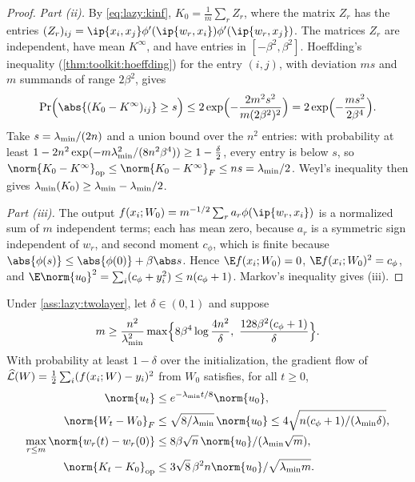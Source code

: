 \begin{refsection}
\begin{proof}
\emph{Part (ii).} By \eqref{eq:lazy:kinf}, $K_0=\frac1m\sum_rZ_r$, where the matrix $Z_r$ has the entries $(Z_r)_{ij}=\ip{x_i,x_j}\phi'(\ip{w_r,x_i})\phi'(\ip{w_r,x_j})$. The matrices $Z_r$ are independent, have mean $K^\infty$, and have entries in $[-\beta^2,\beta^2]$. Hoeffding's inequality (\cref{thm:toolkit:hoeffding}) for the entry $(i,j)$, with deviation $ms$ and $m$ summands of range $2\beta^2$, gives
\[
  \Pr\Bigl(\abs{(K_0-K^\infty)_{ij}}\ge s\Bigr)\le2\exp\Bigl(-\frac{2m^2s^2}{m(2\beta^2)^2}\Bigr)=2\exp\Bigl(-\frac{ms^2}{2\beta^4}\Bigr).
\]
Take $s=\lambda_{\min}/(2n)$ and a union bound over the $n^2$ entries: with probability at least $1-2n^2\exp(-m\lambda_{\min}^2/(8n^2\beta^4))\ge1-\frac\delta2$, every entry is below $s$, so $\norm{K_0-K^\infty}_{\op}\le\norm{K_0-K^\infty}_F\le ns=\lmin/2$. Weyl's inequality then gives $\lambda_{\min}(K_0)\ge\lambda_{\min}-\lambda_{\min}/2$.

\emph{Part (iii).} The output $f(x_i;W_0)=m^{-1/2}\sum_ra_r\phi(\ip{w_r,x_i})$ is a normalized sum of $m$ independent terms; each has mean zero, because $a_r$ is a symmetric sign independent of $w_r$, and second moment $c_\phi$, which is finite because $\abs{\phi(s)}\le\abs{\phi(0)}+\beta\abs s$. Hence $\E f(x_i;W_0)=0$, $\E f(x_i;W_0)^2=c_\phi$, and $\E\norm{u_0}^2=\sum_i(c_\phi+y_i^2)\le n(c_\phi+1)$. Markov's inequality gives (iii).
\end{proof}

\begin{theorem}\label{thm:lazy:twolayer}
Under \cref{ass:lazy:twolayer}, let $\delta\in(0,1)$ and suppose
\begin{equation}\label{eq:lazy:width}
  m\ge\frac{n^2}{\lmin^2}\max\Bigl\{8\beta^4\log\frac{4n^2}\delta,\ \frac{128\beta^2(c_\phi+1)}\delta\Bigr\}.
\end{equation}
With probability at least $1-\delta$ over the initialization, the gradient flow of $\widehat{\mathcal{L}}(W)=\frac12\sum_i(f(x_i;W)-y_i)^2$ from $W_0$ satisfies, for all $t\ge0$,
\begin{align*}
  \norm{u_t}&\le e^{-\lmin t/8}\norm{u_0},\\
  \norm{W_t-W_0}_F&\le\sqrt{8/\lmin}\,\norm{u_0}\le4\sqrt{n(c_\phi+1)/(\lmin\delta)},\\
  \max_{r\le m}\norm{w_r(t)-w_r(0)}&\le8\beta\sqrt n\,\norm{u_0}/(\lmin\sqrt m),\\
  \norm{K_t-K_0}_{\op}&\le3\sqrt8\,\beta^2n\norm{u_0}/\sqrt{\lmin m} .
\end{align*}
\end{theorem}


\end{refsection}
